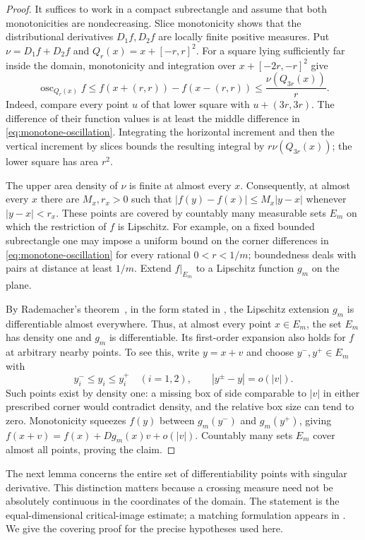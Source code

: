 \begin{proof}
It suffices to work in a compact subrectangle and assume that both
monotonicities are nondecreasing.  Slice monotonicity shows that the
distributional derivatives $D_1f,D_2f$ are locally finite positive
measures.  Put $\nu=D_1f+D_2f$ and
$Q_r(x)=x+[-r,r]^2$.  For a square lying sufficiently far inside the
domain, monotonicity and integration over
$x+[-2r,-r]^2$ give
\begin{equation}
 \operatorname{osc}_{Q_r(x)}f
 \le f(x+(r,r))-f(x-(r,r))
 \le \frac{\nu(Q_{3r}(x))}{r}.
 \label{eq:monotone-oscillation}
\end{equation}
Indeed, compare every point $u$ of that lower square with
$u+(3r,3r)$.  The difference of their function values is at least the
middle difference in \eqref{eq:monotone-oscillation}.  Integrating the
horizontal increment and then the vertical increment by slices bounds
the resulting integral by $r\nu(Q_{3r}(x))$; the lower square has area
$r^2$.

The upper area density of $\nu$ is finite at almost every $x$.
Consequently, at almost every $x$ there are $M_x,r_x>0$ such that
$|f(y)-f(x)|\le M_x|y-x|$ whenever $|y-x|<r_x$.
These points are covered by countably many measurable sets $E_m$ on
which the restriction of $f$ is Lipschitz.  For example, on a fixed
bounded subrectangle one may impose a uniform bound on the corner
differences in \eqref{eq:monotone-oscillation} for every rational
$0<r<1/m$; boundedness deals with pairs at distance at least $1/m$.
Extend $f|_{E_m}$ to a Lipschitz function $g_m$ on the plane.

By Rademacher's theorem~\cite{Rademacher1919}, in the form stated in
\cite[Chapter~2, Theorem~1.4]{Simon2014GMT}, the Lipschitz extension
$g_m$ is differentiable almost everywhere. Thus, at almost every point
$x\in E_m$, the set $E_m$ has density one and $g_m$ is differentiable.  Its first-order expansion also holds for
$f$ at arbitrary nearby points.  To see this, write $y=x+v$ and choose
$y^-,y^+\in E_m$ with
\[
 y^-_i\le y_i\le y^+_i\quad(i=1,2),
 \qquad |y^\pm-y|=o(|v|).
\]
Such points exist by density one: a missing box of side comparable to
$|v|$ in either prescribed corner would contradict density, and the
relative box size can tend to zero.  Monotonicity squeezes $f(y)$ between
$g_m(y^-)$ and $g_m(y^+)$, giving
$f(x+v)=f(x)+Dg_m(x)v+o(|v|)$.
Countably many sets $E_m$ cover almost all points, proving the claim.
\end{proof}

The next lemma concerns the entire set of differentiability points with
singular derivative.  This distinction matters because a crossing measure
need not be absolutely continuous in the coordinates of the domain. The
statement is the equal-dimensional critical-image estimate; a matching
formulation appears in \cite[Appendix~B, Corollary~B.4]{PayneRedaelli2025preprint}.
We give the covering proof for the precise hypotheses used here.

